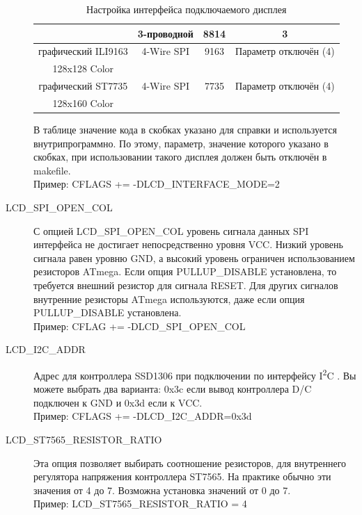 \begin{description}
\begin{table}[H]
\begin{center}
\begin{tabular}{| c | c | c | c|}
                      & 3-проводной      &   8814          &   3 \\
    \hline
  графический ILI9163 & 4-Wire SPI        &   9163          &  Параметр отключён (4) \\
  128x128 Color     &                 &                   &              \\
    \hline
  графический ST7735 & 4-Wire SPI         &   7735          &  Параметр отключён (4) \\
  128x160 Color     &                 &                   &              \\
    \hline
    \end{tabular}
  \end{center}
  \caption{Настройка интерфейса подключаемого дисплея}
  \label{tab:cod-display}
\end{table}

В таблице значение кода в скобках указано для справки и используется внутрипрограммно.
По этому, параметр, значение которого указано в скобках, при использовании такого дисплея 
должен быть отключён в makefile.\\
Пример: CFLAGS += -DLCD\_INTERFACE\_MODE=2

 \item[LCD\_SPI\_OPEN\_COL] С опцией LCD\_SPI\_OPEN\_COL уровень сигнала данных SPI интерфейса
не достигает непосредственно уровня VCC.
Низкий уровень сигнала равен уровню GND, а высокий уровень ограничен использованием  резисторов ATmega.
Если опция PULLUP\_DISABLE установлена, то требуется внешний резистор для сигнала RESET.
Для других сигналов внутренние  резисторы ATmega используются, 
даже если опция PULLUP\_DISABLE установлена.\\
Пример: CFLAG += -DLCD\_SPI\_OPEN\_COL

  \item[LCD\_I2C\_ADDR] Адрес для контроллера SSD1306 при подключении по интерфейсу I\textsuperscript{2}C . Вы можете выбрать два 
варианта: 0x3c если вывод контроллера D/C подключен к GND и 0x3d если к VCC.\\ 
Пример: CFLAGS += -DLCD\_I2C\_ADDR=0x3d

  \item[LCD\_ST7565\_RESISTOR\_RATIO] Эта опция позволяет выбирать соотношение резисторов, для внутреннего 
регулятора напряжения контроллера ST7565.
На практике обычно эти значения от 4 до 7.
Возможна установка значений от 0 до 7.\\
Пример: LCD\_ST7565\_RESISTOR\_RATIO = 4


\end{description}
